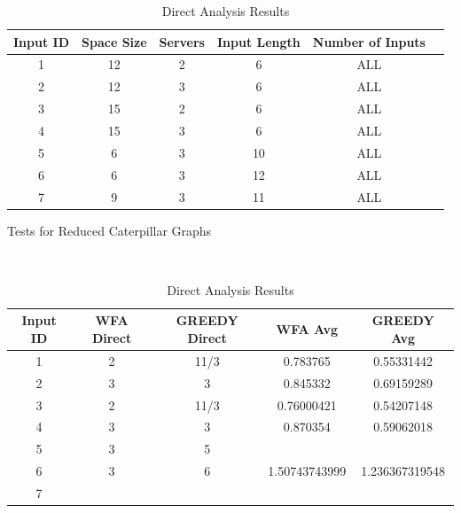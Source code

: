 \begin{table}[!htb]
    \begin{minipage}{.5\linewidth}
      \centering
      \begin{tabular}{|c|c|c|c|c|c|}
        \hline
        Input ID & Space Size & Servers & Input Length & Number of Inputs\\
        \hline
        1 & 12 & 2 & 6 & ALL \\
        \hline
        2 & 12 & 3 & 6 & ALL \\
        \hline
        3 & 15 & 2 & 6 & ALL \\
        \hline
        4 & 15 & 3 & 6 & ALL \\
        \hline
        5 & 6 & 3 & 10 & ALL\\
        \hline
        6 & 6 & 3 & 12 & ALL\\
        \hline
        7 & 9 & 3 & 11 & ALL\\
        \hline
    \end{tabular}
        \caption{Tests for Reduced Caterpillar Graphs}
        \label{tab:tests1}
    \end{minipage}%
    \\
    \begin{minipage}{.5\linewidth}
        \centering
        \begin{tabular}{|c|c|c|c|c|}
          \hline
          Input ID & WFA Direct & GREEDY Direct & WFA Avg & GREEDY Avg\\
          \hline
          1 & 2 & 11/3 & 0.783765 & 0.55331442\\
          \hline
          2 & 3 & 3 & 0.845332 & 0.69159289\\
          \hline
          3 & 2 & 11/3 & 0.76000421 & 0.54207148\\
          \hline
          4 & 3 & 3 & 0.870354 & 0.59062018 \\
          \hline
          5 & 3 & 5 &  &  \\
          \hline
          6 & 3 & 6 & 1.50743743999 & 1.236367319548 \\
          \hline
          7 &  &  &  & \\
          \hline

      \end{tabular}
          \caption{Direct Analysis Results}
          \label{tab:results1}
    \end{minipage} 
\end{table}